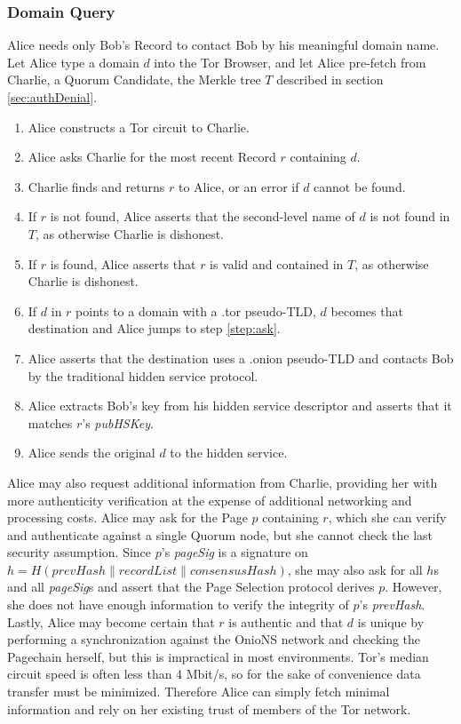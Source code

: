 \documentclass{sig-alternate}
\newcommand*\concat{\mathbin{\|}}
\begin{document}
\subsubsection{Domain Query}

Alice needs only Bob's Record to contact Bob by his meaningful domain name. Let Alice type a domain $ d $ into the Tor Browser, and let Alice pre-fetch from Charlie, a Quorum Candidate, the Merkle tree $ T $ described in section \ref{sec:authDenial}.

\begin{enumerate}
	\item Alice constructs a Tor circuit to Charlie.
	\item \label{step:ask} Alice asks Charlie for the most recent Record $ r $ containing $ d $.
	\item Charlie finds and returns $ r $ to Alice, or an error if $ d $ cannot be found.
	\item If $ r $ is not found, Alice asserts that the second-level name of $ d $ is not found in $ T $, as otherwise Charlie is dishonest.
	\item If $ r $ is found, Alice asserts that $ r $ is valid and contained in $ T $, as otherwise Charlie is dishonest.
	\item If $ d $ in $ r $ points to a domain with a .tor pseudo-TLD, $ d $ becomes that destination and Alice jumps to step \ref{step:ask}.
	\item Alice asserts that the destination uses a .onion pseudo-TLD and contacts Bob by the traditional hidden service protocol.
	\item Alice extracts Bob's key from his hidden service descriptor and asserts that it matches $ r $'s \emph{pubHSKey}.
	\item Alice sends the original $ d $ to the hidden service.
\end{enumerate}

Alice may also request additional information from Charlie, providing her with more authenticity verification at the expense of additional networking and processing costs. Alice may ask for the Page $ p $ containing $ r $, which she can verify and authenticate against a single Quorum node, but she cannot check the last security assumption. Since $ p $'s \emph{pageSig} is a signature on $ h = H(\mathit{prevHash} \concat \mathit{recordList} \concat \mathit{consensusHash}) $, she may also ask for all $ h $s and all \emph{pageSig}s and assert that the Page Selection protocol derives $ p $. However, she does not have enough information to verify the integrity of $ p $'s \emph{prevHash}. Lastly, Alice may become certain that $ r $ is authentic and that $ d $ is unique by performing a synchronization against the OnioNS network and checking the Pagechain herself, but this is impractical in most environments. Tor's median circuit speed is often less than 4 Mbit/s,\cite{TorMetrics} so for the sake of convenience data transfer must be minimized. Therefore Alice can simply fetch minimal information and rely on her existing trust of members of the Tor network.
\end{document}
